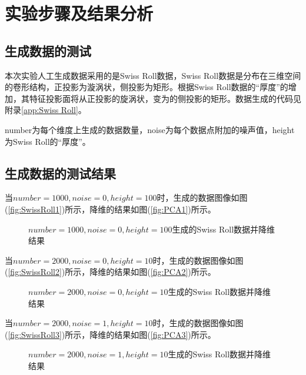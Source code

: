 \documentclass{hitreport}
\begin{document}
\section{实验步骤及结果分析}

\subsection{生成数据的测试}
本次实验人工生成数据采用的是Swiss Roll数据，Swiss Roll数据是分布在三维空间的卷形结构，正投影为漩涡状，侧投影为矩形。根据Swiss Roll数据的“厚度”的增加，其特征投影面将从正投影的旋涡状，变为的侧投影的矩形。数据生成的代码见附录\ref{app:Swiss Roll}。

number为每个维度上生成的数据数量，noise为每个数据点附加的噪声值，height为Swiss Roll的“厚度”。

\subsection{生成数据的测试结果}

当$number=1000, noise=0, height=100$时，生成的数据图像如图(\ref{fig:SwissRoll1})所示，降维的结果如图(\ref{fig:PCA1})所示。

\begin{figure}[h]
	\centering
	\hfill
	\caption{$number=1000, noise=0, height=100$生成的Swiss Roll数据并降维结果}\label{fig:Swiss1}
\end{figure}

当$number=2000, noise=0, height=10$时，生成的数据图像如图(\ref{fig:SwissRoll2})所示，降维的结果如图(\ref{fig:PCA2})所示。

\begin{figure}[h]
	\centering
	\hfill
	\caption{$number=2000, noise=0, height=10$生成的Swiss Roll数据并降维结果}\label{fig:Swiss2}
\end{figure}


当$number=2000, noise=1, height=10$时，生成的数据图像如图(\ref{fig:SwissRoll3})所示，降维的结果如图(\ref{fig:PCA3})所示。


\begin{figure}[h]
	\centering
	\hfill
	\caption{$number=2000, noise=1, height=10$生成的Swiss Roll数据并降维结果}\label{fig:Swiss3}
\end{figure}
\end{document}
